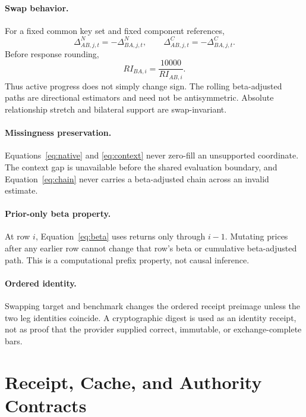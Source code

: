 \documentclass{article}
\begin{document}
\paragraph{Swap behavior.}
For a fixed common key set and fixed component references,
\begin{equation}
\Delta^N_{AB,j,t}=-\Delta^N_{BA,j,t},
\qquad
\Delta^C_{AB,j,t}=-\Delta^C_{BA,j,t}.
\label{eq:antisymmetry}
\end{equation}
Before response rounding,
\begin{equation}
RI_{BA,i}=\frac{10000}{RI_{AB,i}}.
\label{eq:reciprocity}
\end{equation}
Thus active progress does not simply change sign. The rolling beta-adjusted paths are directional estimators and need not be antisymmetric. Absolute relationship stretch and bilateral support are swap-invariant.

\paragraph{Missingness preservation.}
Equations~\ref{eq:native} and \ref{eq:context} never zero-fill an unsupported coordinate. The context gap is unavailable before the shared evaluation boundary, and Equation~\ref{eq:chain} never carries a beta-adjusted chain across an invalid estimate.

\paragraph{Prior-only beta property.}
At row $i$, Equation~\ref{eq:beta} uses returns only through $i-1$. Mutating prices after any earlier row cannot change that row's beta or cumulative beta-adjusted path. This is a computational prefix property, not causal inference.

\paragraph{Ordered identity.}
Swapping target and benchmark changes the ordered receipt preimage unless the two leg identities coincide. A cryptographic digest is used as an identity receipt, not as proof that the provider supplied correct, immutable, or exchange-complete bars.

\section{Receipt, Cache, and Authority Contracts}
\end{document}
